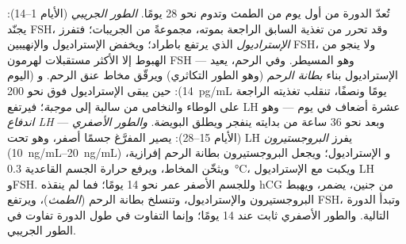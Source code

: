 \begin{definition}\label{def:b2:reproductive-hormones:cycle}
تُعدّ الدورة من أول يوم من الطمث وتدوم
نحو 28 يومًا. \emph{الطور الجريبي} (الأيام 1--14): يجنّد FSH،
وقد تحرر من تغذية  السابق الراجعة بموته، مجموعةً
من الجريبات؛ فتفرز \emph{الإستراديول} الذي يرتفع باطراد؛
ويخفض الإستراديول والإنهيبين FSH، ولا ينجو من الهبوط إلا 
الأكثر مستقبلات لهرمون FSH --- وهو  المسيطر. وفي
الرحم، يعيد الإستراديول بناء \emph{بطانة الرحم} (وهو
الطور التكاثري) ويرقّق مخاط عنق الرحم. و\emph{}
(اليوم 14): حين يبقى الإستراديول فوق نحو \qty{200}{pg/mL}
يومًا ونصفًا، تنقلب تغذيته الراجعة على الوطاء والنخامى
من سالبة إلى \emph{موجبة}؛ فيرتفع LH عشرة أضعاف في يوم
--- وهو \emph{اندفاع LH} --- وبعد نحو 36 ساعة من بدايته
ينفجر  ويطلق البويضة. \emph{والطور الأصفري} (الأيام
15--28): يصير  المفرَّغ جسمًا أصفر، وهو
تحت LH يفرز \emph{البروجستيرون} (\qtyrange{10}{20}{ng/mL}) و
الإستراديول؛ ويجعل البروجستيرون بطانة الرحم إفرازية، ويثخّن
المخاط، ويرفع حرارة الجسم القاعدية \qty{0.3}{\celsius}،
ويكبت مع الإستراديول LH وFSH. وللجسم الأصفر
عمر نحو 14 يومًا؛ فما لم ينقذه hCG من جنين،
يضمر، ويهبط البروجستيرون والإستراديول، وتنسلخ بطانة الرحم
(\emph{الطمث})، ويرتفع FSH، وتبدأ الدورة التالية. والطور
الأصفري ثابت عند 14 يومًا؛ وإنما التفاوت في طول الدورة
تفاوت في الطور الجريبي.
\end{definition}

